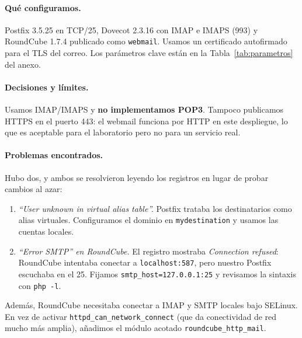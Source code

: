 \documentclass[11pt,a4paper]{article}
\begin{document}
\paragraph{Qué configuramos.} Postfix 3.5.25 en TCP/25, Dovecot 2.3.16 con IMAP e IMAPS (993) y RoundCube 1.7.4 publicado como \texttt{webmail}. Usamos un certificado autofirmado para el TLS del correo. Los parámetros clave están en la Tabla~\ref{tab:parametros} del anexo.

\paragraph{Decisiones y límites.} Usamos IMAP/IMAPS y \textbf{no implementamos POP3}. Tampoco publicamos HTTPS en el puerto 443: el webmail funciona por HTTP en este despliegue, lo que es aceptable para el laboratorio pero no para un servicio real.

\paragraph{Problemas encontrados.} Hubo dos, y ambos se resolvieron leyendo los registros en lugar de probar cambios al azar:
\begin{enumerate}\setlength\itemsep{0pt}
\item \emph{``User unknown in virtual alias table''.} Postfix trataba los destinatarios como alias virtuales. Configuramos el dominio en \texttt{mydestination} y usamos las cuentas locales.
\item \emph{``Error SMTP'' en RoundCube.} El registro mostraba \emph{Connection refused}: RoundCube intentaba conectar a \texttt{localhost:587}, pero nuestro Postfix escuchaba en el 25. Fijamos \texttt{smtp\_host=127.0.0.1:25} y revisamos la sintaxis con \texttt{php -l}.
\end{enumerate}
Además, RoundCube necesitaba conectar a IMAP y SMTP locales bajo SELinux. En vez de activar \texttt{httpd\_can\_network\_connect} (que da conectividad de red mucho más amplia), añadimos el módulo acotado \texttt{roundcube\_http\_mail}.
\end{document}
